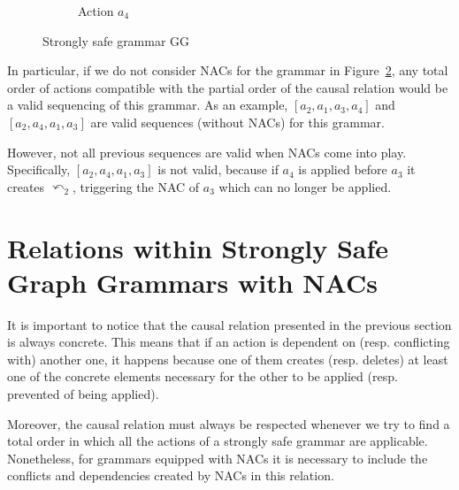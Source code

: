 \begin{example}
\begin{figure}[!ht]
\begin{subfigure}[t]{.2\textwidth}
    \caption{Action $a_4$}\label{fig:process:unconditional-relation:a4}
  \end{subfigure}
  \caption{Strongly safe grammar GG}\label{fig:process:unconditional-relation}
\end{figure}

  In particular, if we do not consider NACs for the grammar in Figure~\ref{fig:process:unconditional-relation}, any total order of actions compatible with the partial order of the causal relation would be a valid sequencing of this grammar. As an example, $[a_2, a_1, a_3, a_4]$ and $[a_2, a_4, a_1, a_3]$ are valid sequences (without NACs) for this grammar. 

  However, not all previous sequences are valid when NACs come into play. Specifically, $[a_2, a_4, a_1, a_3]$ is not valid, because if $a_4$ is applied before $a_3$ it creates $\curvearrowleft_2$, triggering the NAC of $a_3$ which can no longer be applied. 
\end{example}

\section{Relations within Strongly Safe Graph Grammars with NACs}

It is important to notice that the causal relation presented in the previous section is always concrete. This means that if an action is dependent on (resp. conflicting with) another one, it happens because one of them creates (resp. deletes) at least one of the concrete elements necessary for the other to be applied (resp. prevented of being applied).

Moreover, the causal relation must always be respected whenever we try to find a total order in which all the actions of a strongly safe grammar are applicable. Nonetheless, for grammars equipped with NACs it is necessary to include the conflicts and dependencies created by NACs in this relation.

